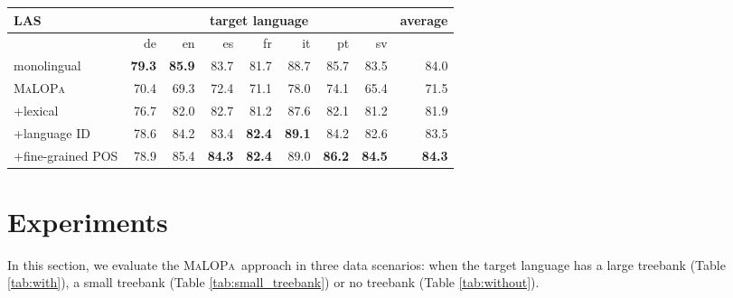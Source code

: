\documentclass[11pt]{article}
\newcommand{\malopa}{\textsc{MaLOPa}}
\begin{document}
\begin{table*}[!]
\centering



\begin{tabular}{l|r|r|r|r|r|r|r||r}
LAS & \multicolumn{7}{c||}{target language} & average \\ \hline
                                                       & {de} & {en} & {es} & {fr} & {it} & {pt} & {sv} & {}   \\ \hline
monolingual                                   & \textbf{79.3} & \textbf{85.9} & 83.7 & 81.7 & 88.7 & 85.7 & 83.5 & 84.0 \\ \hline
\malopa                            & 70.4 & 69.3 & 72.4 & 71.1 & 78.0 & 74.1 & 65.4 & 71.5 \\
                   +lexical                   & 76.7 & 82.0 & 82.7 & 81.2 & 87.6 & 82.1 & 81.2 & 81.9 \\ 
\hspace{0.1cm} +language ID                   & 78.6 & 84.2 & 83.4 & \textbf{82.4} & \textbf{89.1} & 84.2 & 82.6 & 83.5 \\
\hspace{0.3cm} +fine-grained POS              & 78.9 & 85.4 & \textbf{84.3} & \textbf{82.4} & 89.0 & \textbf{86.2} & \textbf{84.5} & \textbf{84.3} \\ \end{tabular}

\caption{Dependency parsing:  labeled attachment scores (LAS) for monolingually-trained parsers and \malopa ~in the fully supervised scenario where . Note that we use the universal dependencies verson 1.2 which only includes annotations for 13,000 English sentences, which explains the relatively low scores in English. When we instead use the universal dependency treebanks version 2.0 which includes annotations for 40,000 English sentences (originally from the English Penn Treebank), we achieve UAS score 93.0 and LAS score  91.5.
\label{tab:with}}
\end{table*}

\section{Experiments}

In this section, we evaluate the \malopa~approach in three data scenarios: when the target language has a large treebank (Table \ref{tab:with}), a small treebank (Table \ref{tab:small_treebank}) or no treebank (Table \ref{tab:without}).
\end{document}
